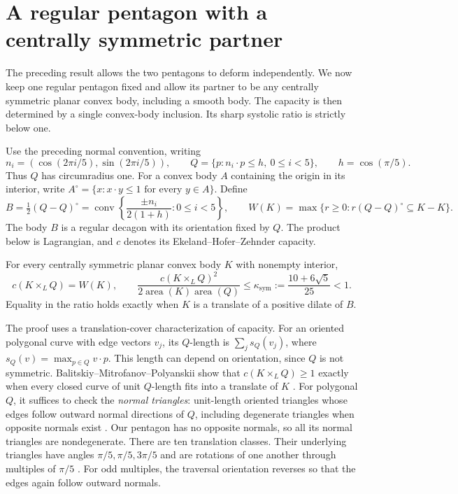 \section{A regular pentagon with a centrally symmetric partner}

The preceding result allows the two pentagons to deform independently.
We now keep one regular pentagon fixed and allow its partner to be any
centrally symmetric planar convex body, including a smooth body. The
capacity is then determined by a single convex-body inclusion. Its sharp
systolic ratio is strictly below one.

Use the preceding normal convention, writing
\[
 n_i=(\cos(2\pi i/5),\sin(2\pi i/5)),\qquad
 Q=\{p:n_i\cdot p\le h,\ 0\le i<5\},\qquad h=\cos(\pi/5).
\]
Thus $Q$ has circumradius one. For a convex body $A$ containing the origin
in its interior, write
$A^\circ=\{x:x\cdot y\le1\text{ for every }y\in A\}$.
Define
\[
 B=\tfrac12(Q-Q)^\circ
   =\operatorname{conv}\left\{\frac{\pm n_i}{2(1+h)}:0\le i<5\right\},
 \qquad
 W(K)=\max\{r\ge0:r(Q-Q)^\circ\subseteq K-K\}.
\]
The body $B$ is a regular decagon with its orientation fixed by $Q$.
The product below is Lagrangian, and $c$ denotes its
Ekeland--Hofer--Zehnder capacity.

\begin{theorem}
For every centrally symmetric planar convex body $K$ with nonempty interior,
\[
 c(K\times_L Q)=W(K),\qquad
 \frac{c(K\times_L Q)^2}{2\operatorname{area}(K)\operatorname{area}(Q)}
 \le \kappa_{\mathrm{sym}}:=\frac{10+6\sqrt5}{25}<1.
\]
Equality in the ratio holds exactly when $K$ is a translate of a positive
dilate of $B$.
\end{theorem}

The proof uses a translation-cover characterization of capacity.
For an oriented polygonal curve with edge vectors $v_j$, its $Q$-length is
$\sum_j s_Q(v_j)$, where $s_Q(v)=\max_{p\in Q}v\cdot p$.
This length can depend on orientation, since $Q$ is not symmetric.
Balitskiy--Mitrofanov--Polyanskii show that $c(K\times_L Q)\ge1$ exactly
when every closed curve of unit $Q$-length fits into a translate of $K$
\cite[Theorem 2.5]{BMP}.
For polygonal $Q$, it suffices to check the \emph{normal triangles}:
unit-length oriented triangles whose edges follow outward normal directions
of $Q$, including degenerate triangles when opposite normals exist
\cite[Definition 3.2 and Theorem 3.3]{BMP}. Our pentagon has no opposite
normals, so all its normal triangles are nondegenerate. There are ten translation
classes. Their underlying triangles have angles $\pi/5,\pi/5,3\pi/5$
and are rotations of one another through multiples of $\pi/5$
\cite[Section 6.1]{BMP}. For odd multiples, the traversal orientation
reverses so that the edges again follow outward normals.

